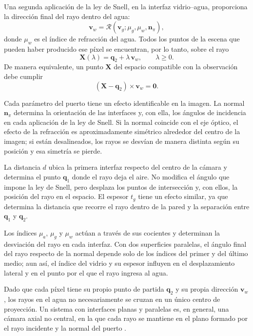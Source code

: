 Una segunda aplicación de la ley de Snell, en la interfaz vidrio--agua, proporciona la dirección final del rayo dentro del agua:
\begin{equation}
\mathbf{v}_w = \mathcal{R}(\mathbf{v}_g; \mu_g, \mu_w, \mathbf{n}_\pi),
\label{eq:vw}
\end{equation}
donde $\mu_w$ es el índice de refracción del agua. Todos los puntos de la escena que pueden haber producido ese píxel se encuentran, por lo tanto, sobre el rayo \parencite{Agrawal2012,Treibitz2012}
\begin{equation}
\mathbf{X}(\lambda) = \mathbf{q}_2 + \lambda\,\mathbf{v}_w, \qquad \lambda \geq 0 .
\label{eq:rayo}
\end{equation}
De manera equivalente, un punto $\mathbf{X}$ del espacio compatible con la observación debe cumplir
\begin{equation}
(\mathbf{X} - \mathbf{q}_2) \times \mathbf{v}_w = \mathbf{0}.
\label{eq:restriccion}
\end{equation}

Cada parámetro del puerto tiene un efecto identificable en la imagen. La normal $\mathbf{n}_\pi$ determina la orientación de las interfaces y, con ella, los ángulos de incidencia en cada aplicación de la ley de Snell. Si la normal coincide con el eje óptico, el efecto de la refracción es aproximadamente simétrico alrededor del centro de la imagen; si están desalineados, los rayos se desvían de manera distinta según su posición y esa simetría se pierde.

La distancia $d$ ubica la primera interfaz respecto del centro de la cámara y determina el punto $\mathbf{q}_1$ donde el rayo deja el aire. No modifica el ángulo que impone la ley de Snell, pero desplaza los puntos de intersección y, con ellos, la posición del rayo en el espacio. El espesor $t_g$ tiene un efecto similar, ya que determina la distancia que recorre el rayo dentro de la pared y la separación entre $\mathbf{q}_1$ y $\mathbf{q}_2$.

Los índices $\mu_a$, $\mu_g$ y $\mu_w$ actúan a través de sus cocientes y determinan la desviación del rayo en cada interfaz. Con dos superficies paralelas, el ángulo final del rayo respecto de la normal depende solo de los índices del primer y del último medio; aun así, el índice del vidrio y su espesor influyen en el desplazamiento lateral y en el punto por el que el rayo ingresa al agua.

Dado que cada píxel tiene su propio punto de partida $\mathbf{q}_2$ y su propia dirección $\mathbf{v}_w$, los rayos en el agua no necesariamente se cruzan en un único centro de proyección. Un sistema con interfaces planas y paralelas es, en general, una cámara axial no central, en la que cada rayo se mantiene en el plano formado por el rayo incidente y la normal del puerto \parencite{Agrawal2012}.

